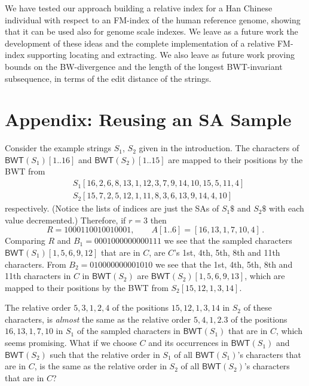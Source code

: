 \documentclass{llncs}
\newcommand{\BWT}
  {\ensuremath{\mathsf{BWT}}}
\begin{document}
We have tested our approach building a relative index for a Han Chinese
individual with respect to an FM-index of the human reference genome, showing
that it can be used also for genome scale indexes. We leave as a future work
the development of these ideas and the complete implementation of a relative
FM-index supporting locating and extracting.  We also leave as future work
proving bounds on the BW-divergence and the length of the longest
BWT-invariant subsequence, in terms of the edit distance of the strings.






\appendix

\section*{Appendix: Reusing an SA Sample} \label{sec:sample}

Consider the example strings $S_1$, $S_2$ given in the introduction.  The characters of
\(\BWT (S_1) [1..16]\) and \(\BWT (S_2) [1..15]\) are mapped to their
positions by the BWT from
\begin{align*}
& S_1 [16, 2, 6, 8, 13, 1, 12, 3, 7, 9, 14, 10, 15, 5, 11, 4]\\
& S_2 [15, 7, 2, 5, 12, 1, 11, 8, 3, 6, 13, 9, 14, 4, 10]
\end{align*}
respectively.  (Notice the lists of indices are just the SAs of $S_1\$$ and
$S_2\$$ with each value decremented.)  Therefore, if \(r = 3\) then
$$
R = 1000110010010001, \qquad
A [1..6] = [16, 13, 1, 7, 10, 4]\,.
$$
Comparing $R$ and
\(B_1 = 0001000000000111\)
we see that the sampled characters \(\BWT (S_1) [1, 5, 6, 9, 12]\) that are
in $C$, are $C$'s 1st, 4th, 5th, 8th and 11th characters.  From
\(B_2 = 010000000001010\)
we see that the 1st, 4th, 5th, 8th and 11th characters in $C$ in \(\BWT
(S_2)\) are \(\BWT (S_2) [1, 5, 6, 9, 13]\), which are mapped to their
positions by the BWT from \(S_2 [15, 12, 1, 3, 14]\).

The relative order \(5, 3, 1, 2, 4\) of the positions \(15, 12, 1, 3, 14\) in
$S_2$ of these characters, is {\em almost} the same as the relative order
\(5, 4, 1, 2. 3\) of the positions \(16, 13, 1, 7, 10\) in $S_1$ of the
sampled characters in \(\BWT (S_1)\) that are in $C$, which seems promising.
What if we choose $C$ and its occurrences in \(\BWT (S_1)\) and \(\BWT
(S_2)\) such that the relative order in $S_1$ of all \(\BWT (S_1)\)'s
characters that are in $C$, is the same as the relative order in $S_2$ of all
\(\BWT (S_2)\)'s characters that are in $C$?
\end{document}
